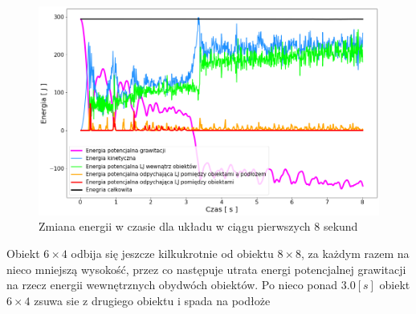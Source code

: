 \documentclass[12pt, letterpaper]{report}
\begin{document}
    \begin{figure}[H]
        \centering
        \includegraphics[width=14cm]{energy_test_0to8s}
        \caption{Zmiana energii w czasie dla układu w ciągu pierwszych 8 sekund}
    \end{figure}
    
    Obiekt $6 \times 4$ odbija się jeszcze kilkukrotnie od obiektu $8 \times 8$, za każdym 
    razem na nieco mniejszą wysokość, przez co następuje utrata energi potencjalnej grawitacji 
    na rzecz energii wewnętrznych obydwóch obiektów. Po nieco ponad $3.0 [s]$ obiekt 
    $6 \times 4$ zsuwa sie z drugiego obiektu i spada na podłoże
\end{document}
